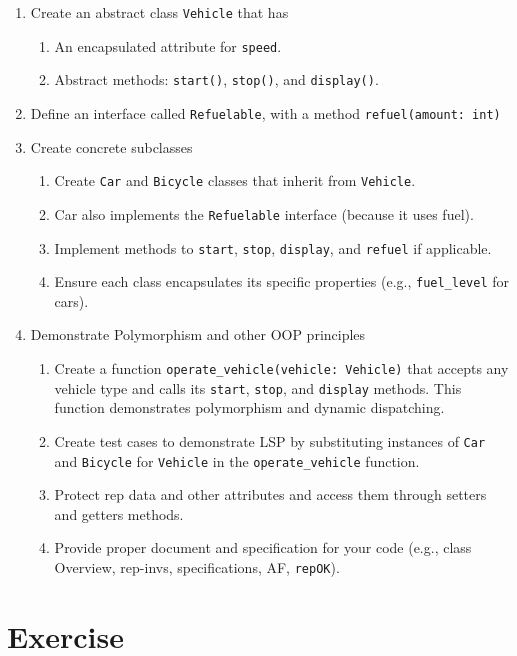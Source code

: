 \documentclass[oneside,11pt,dvipsnames]{book}
\newcommand{\code}[1]{\texttt{#1}}
\begin{document}
\begin{enumerate}
    \item Create an abstract class \code{Vehicle} that has
    \begin{enumerate}
        \item An encapsulated attribute for \code{speed}.
        \item Abstract methods: \code{start()}, \code{stop()}, and \code{display()}.
    \end{enumerate}
    \item Define an interface called \code{Refuelable}, with a method \code{refuel(amount: int)}
    \item Create concrete subclasses
    \begin{enumerate}
	    \item Create \code{Car} and \code{Bicycle} classes that inherit from \code{Vehicle}.
	    \item Car also implements the \code{Refuelable} interface (because it uses fuel).
	    \item Implement methods to \code{start}, \code{stop}, \code{display}, and \code{refuel} if applicable.
	    \item Ensure each class encapsulates its specific properties (e.g., \code{fuel\_level} for cars).
    \end{enumerate}
    \item Demonstrate Polymorphism and other OOP principles
    \begin{enumerate}
        \item Create a function \code{operate\_vehicle(vehicle: Vehicle)} that accepts any vehicle type and calls its \code{start}, \code{stop}, and \code{display} methods. This function demonstrates polymorphism and dynamic dispatching.
        \item Create test cases to demonstrate LSP by substituting instances of \code{Car} and \code{Bicycle} for \code{Vehicle} in the \code{operate\_vehicle} function. 
        \item Protect rep data and other attributes and access them through setters and getters methods.
    \item Provide proper document and specification for your code (e.g., class Overview, rep-invs, specifications, AF, \code{repOK}).
    \end{enumerate}

\end{enumerate}

\section{Exercise}
\end{document}
